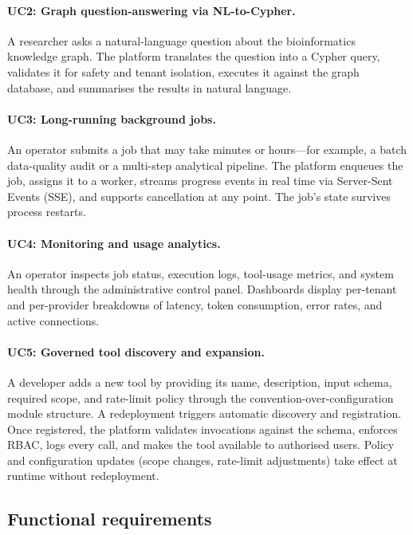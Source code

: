 \documentclass[a4paper]{sapthesis}
\begin{document}
\paragraph{UC2: Graph question-answering via NL-to-Cypher.}
A researcher asks a natural-language question about the bioinformatics
knowledge graph.  The platform translates the question into a Cypher query,
validates it for safety and tenant isolation, executes it against the graph
database, and summarises the results in natural language.

\paragraph{UC3: Long-running background jobs.}
An operator submits a job that may take minutes or hours---for example, a
batch data-quality audit or a multi-step analytical pipeline.  The platform
enqueues the job, assigns it to a worker, streams progress events in real
time via Server-Sent Events (SSE), and supports cancellation at any point.
The job's state survives process restarts.

\paragraph{UC4: Monitoring and usage analytics.}
An operator inspects job status, execution logs, tool-usage metrics, and
system health through the administrative control panel.  Dashboards display
per-tenant and per-provider breakdowns of latency, token consumption, error
rates, and active connections.

\paragraph{UC5: Governed tool discovery and expansion.}
A developer adds a new tool by providing its name, description, input
schema, required scope, and rate-limit policy through the
convention-over-configuration module structure.  A redeployment triggers
automatic discovery and registration.  Once registered, the platform
validates invocations against the schema, enforces RBAC, logs every call,
and makes the tool available to authorised users.  Policy and
configuration updates (scope changes, rate-limit adjustments) take effect
at runtime without redeployment.

\subsection{Functional requirements}
\label{sec:functional-requirements}
\end{document}
